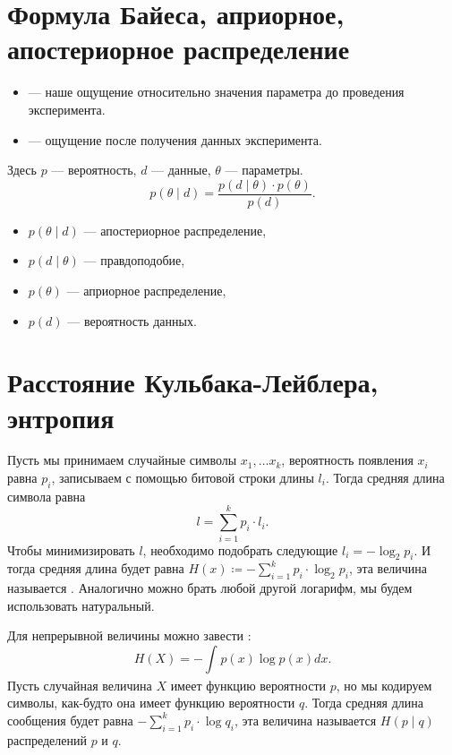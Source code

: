 \documentclass[11pt]{book}
\begin{document}
\section{Формула Байеса, априорное, апостериорное распределение}
\begin{itemize}
	\item {} --- наше ощущение относительно значения параметра до проведения эксперимента.
	\item {} --- ощущение после получения данных эксперимента.
\end{itemize}
\begin{definition}
	Здесь $p$ --- вероятность, $d$ --- данные, $\theta$ --- параметры.
	\[
	p(\theta \mid d) = \frac{p(d \mid \theta) \cdot p(\theta)}{p(d)}
	.\] 
	\begin{itemize}
		\item $p(\theta \mid d)$ --- апостериорное распределение,
		\item $p(d \mid \theta)$ --- правдоподобие,
		\item $p(\theta)$ --- априорное распределение,
		\item $p(d)$ --- вероятность данных.
	\end{itemize}
\end{definition}

\section{Расстояние Кульбака-Лейблера, энтропия}
Пусть мы принимаем случайные символы $x_1, \ldots x_{k}$, вероятность появления $x_{i}$ равна $p_i$, записываем с помощью битовой строки длины $l_i$. Тогда средняя длина символа равна 
\[
l = \sum_{i=1}^{k} p_i \cdot l_i
.\] 
Чтобы минимизировать $l$, необходимо подобрать следующие $l_i = - \log_2{p_i}$. И тогда средняя длина будет равна $H(x) \coloneqq - \sum_{i=1}^{k} p_i \cdot  \log_2{p_i}$, эта величина называется . Аналогично можно брать любой другой логарифм, мы будем использовать натуральный.

Для непрерывной величины можно завести :
\[
H(X) = - \int_{}^{} p(x) \log{p(x)} dx 
.\] 
Пусть случайная величина $X$ имеет функцию вероятности $p$, но мы кодируем символы, как-будто она имеет функцию вероятности $q$. Тогда средняя длина сообщения будет равна $- \sum_{i=1}^{k} p_i \cdot \log{q_i}$, эта величина называется  $H(p \mid q)$ распределений $p$ и $q$.
\end{document}
